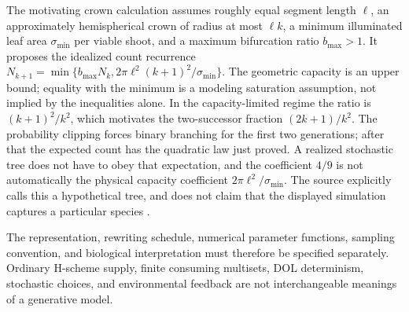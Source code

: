 The motivating crown calculation assumes roughly equal segment length
\(\ell\), an approximately hemispherical crown of radius at most \(\ell k\),
a minimum illuminated leaf area \(\sigma_{\min}\) per viable shoot,
and a maximum bifurcation ratio \(b_{\max}>1\).
It proposes the idealized count recurrence
\(N_{k+1}=\min\{b_{\max}N_k,2\pi\ell^2(k+1)^2/\sigma_{\min}\}\).
The geometric capacity is an upper bound; equality with the minimum is a
modeling saturation assumption, not implied by the inequalities alone.
In the capacity-limited regime the ratio is \((k+1)^2/k^2\), which motivates
the two-successor fraction \((2k+1)/k^2\).
The probability clipping forces binary branching for the first two
generations; after that the expected count has the quadratic law just proved.
A realized stochastic tree does not have to obey that expectation, and the
coefficient \(4/9\) is not automatically the physical capacity coefficient
\(2\pi\ell^2/\sigma_{\min}\).
The source explicitly calls this a hypothetical tree, and does not claim
that the displayed simulation captures a particular species
\cite[pp.~556--558]{PrusinkiewiczEtAl1997DevelopmentIntake}.

The representation, rewriting schedule, numerical parameter functions,
sampling convention, and biological interpretation must therefore be
specified separately. Ordinary H-scheme supply, finite consuming multisets,
DOL determinism, stochastic choices, and environmental feedback are not
interchangeable meanings of a generative model.

